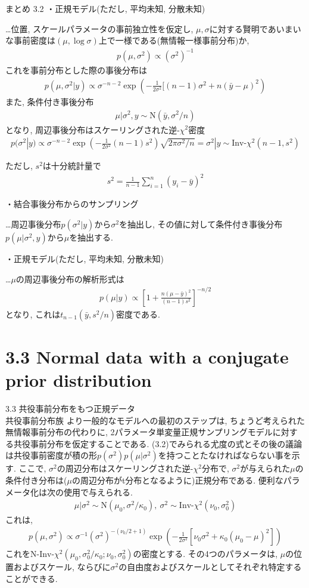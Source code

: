\documentclass[10pt,dvipdfmx,a4]{beamer}
\newcommand{\eq}[1]{\begin{align}#1\end{align}}
\newcommand{\eqn}[1]{\begin{align*}#1\end{align*}}
\begin{document}

\begin{frame}[t]{まとめ 3.2}
・正規モデル(ただし, 平均未知, 分散未知)

…位置, スケールパラメータの事前独立性を仮定し, $\mu, \sigma$に対する賢明であいまいな事前密度は$(\mu, \log \sigma)$上で一様である(無情報一様事前分布)か,
\eqn{p(\mu,\sigma^2)\propto (\sigma^2)^{-1}}
これを事前分布とした際の事後分布は
\eqn{p(\mu,\sigma^2|y)\propto\sigma^{-n-2}\exp\left(-\tfrac{1}{2\sigma^2}[(n-1)\sigma^2+n(\bar{y}-\mu)^2\right)}
また, 条件付き事後分布
\eqn{\mu|\sigma^2, y\sim\text{N}(\bar{y},\sigma^2/n)}
となり, 周辺事後分布はスケーリングされた逆-$\chi^2$密度
\eqn{p(\sigma^2|y)\propto \sigma^{-n-2}\exp \left(-\tfrac{1}{2\sigma^2}(n-1)s^2\right)\sqrt{2\pi\sigma^2/n}=\sigma^2|y\sim \text{Inv-}\chi^2(n-1,s^2)}
\end{frame}


\begin{frame}[t]
ただし, $s^2$は十分統計量で
\eqn{s^2=\tfrac{1}{n-1}\sum_{i=1}^n(y_i-\bar{y})^2}

・結合事後分布からのサンプリング

…周辺事後分布$p(\sigma^2|y)$から$\sigma^2$を抽出し, その値に対して条件付き事後分布$p(\mu|\sigma^2,y)$から$\mu$を抽出する.

・正規モデル(ただし, 平均未知, 分散未知)

…$\mu$の周辺事後分布の解析形式は
\eqn{p(\mu|y)\propto \left[ 1+\frac{n(\mu-\bar{y})^2}{(n-1)s^2}\right]^{-n/2}}
となり, これは$t_{n-1}(\bar{y},s^2/n)$密度である.
\end{frame}

\section{3.3 Normal data with a conjugate prior distribution}
\begin{frame}{3.3 共役事前分布をもつ正規データ\\共役事前分布族}
より一般的なモデルへの最初のステップは, ちょうど考えられた無情報事前分布の代わりに, 2パラメータ単変量正規サンプリングモデルに対する共役事前分布を仮定することである.
(3.2)でみられる尤度の式とその後の議論は共役事前密度が積の形$p(\sigma^2)p(\mu|\sigma^2)$を持つことたなければならない事を示す.
ここで, $\sigma^2$の周辺分布はスケーリングされた逆-$\chi^2$分布で, $\sigma^2$が与えられた$\mu$の条件付き分布は($\mu$の周辺分布がt分布となるように)正規分布である.
便利なパラメータ化は次の使用で与えられる.
\eqn{\mu|\sigma^2\sim \text{N}(\mu_0,\sigma^2/\kappa_0),\ \sigma^2\sim \text{Inv-}\chi^2(\nu_0,\sigma_0^2)}
これは, 
\eq{p(\mu,\sigma^2)\propto \sigma^{-1}(\sigma^2)^{-(\nu_0/2+1)}\exp\left(-\frac{1}{2\sigma^2}[\nu_0\sigma^2+\kappa_0(\mu_0-\mu)^2]\right)}
これを$\text{N-Inv-}\chi^2(\mu_0,\sigma^2_0/\kappa_0;\nu_0,\sigma^2_0)$の密度とする.
その4つのパラメータは, $\mu$の位置およびスケール, ならびに$\sigma^2$の自由度およびスケールとしてそれぞれ特定することができる.
\end{frame}
\end{document}
